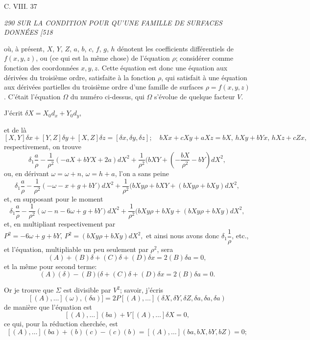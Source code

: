 \documentclass[11pt,a4paper]{book}
\begin{document}
\medskip
\hfill C. VIII. \hfill 37

\clearpage

\noindent\textit{290 \hfill SUR LA CONDITION POUR QU'UNE FAMILLE DE SURFACES DONN\'EES \hfill [518}

\medskip

o\`u, \`a pr\'esent, $X$, $Y$, $Z$, $a$, $b$, $c$, $f$, $g$, $h$ d\'enotent les coefficients diff\'erentiels de $f(x, y, z)$,
ou (ce qui est la m\^eme chose) de l'\'equation $\rho$; consid\'erer comme fonction des coordonn\'ees
$x, y, z$. Cette \'equation est donc une \'equation aux d\'eriv\'ees du troisi\`eme ordre,
satisfaite \`a la fonction $\rho$, qui satisfait \`a une \'equation aux d\'eriv\'ees partielles du troisi\`eme ordre
d'une famille de surfaces $\rho = f(x, y, z)$. C'\'etait l'\'equation $\Omega$ du num\'ero ci-dessus, qui
$\Omega$ s'\'evolue de quelque facteur $V$.

J'\'ecrit $\delta X = X_{0} d_{x} + Y_{0} d_{y}$,

\medskip

et de l\`a
\[
[X, Y]\delta x + [Y, Z]\delta y + [X, Z]\delta z = [\delta x, \delta y, \delta z]; \quad b X x + c X y + a X z = bX, \, h X y + b Y x, \, h X z + c Z x,
\]
respectivement, on trouve
\[
\delta_1\frac{a}{\rho} - \frac{1}{\rho^2}(- a X + b Y X + 2a)d X^2 + \frac{1}{\rho^2}(b X Y + (- \frac{b X}{\rho^2} - bY)d X^2,
\]
ou, en d\'erivant $\omega = \omega + n$, $\omega = h + a$, l'on a sans peine
\[
\delta_1\frac{a}{\rho} - \frac{1}{\rho^2}(- \omega - x + g + b Y)d X^2 + \frac{1}{\rho^2}(b X y \rho + b X Y + (b X y \rho + b X y)d X^2,
\]
et, en supposant pour le moment
\[
\delta_1\frac{a}{\rho} - \frac{1}{\rho^2}(\omega - n - 6\omega + g + b Y)d X^2 + \frac{1}{\rho^2}(b X y \rho + b X y + (b X y \rho + b X y)d X^2,
\]
et, en multipliant respectivement par $P^2 = - 6\omega + g + b Y, \, P^2 = (b X y \rho + b X y) d X^2,$ et ainsi
nous avons donc $\delta_1\dfrac{1}{\rho}$, etc., et l'\'equation, multipliable un peu seulement par $\rho^2$, sera
\[
(A) + (B)\delta + (C)\delta + (D)\delta x = 2(B)\delta a = 0,
\]
et la m\^eme pour second terme:
\[
(A)(\delta) - (B)(\delta + (C)\delta + (D)\delta x = 2(B)\delta a = 0.
\]

\medskip

\quad Or je trouve que $\Sigma$ est divisible par $V^2$; savoir, j'\'ecris
\[
[(A), \ldots]( \omega), (\delta a)] = 2P[(A), \ldots](\delta X, \delta Y, \delta Z, \delta a, \delta a, \delta a)
\]
de mani\`ere que l'\'equation est
\[
[(A), \ldots](b a) + V[(A), \ldots]\delta X = 0,
\]
ce qui, pour la r\'eduction cherch\'ee, est
\[
[(A), \ldots]( b a) + ( b)( c) - ( c)( b) = [(A), \ldots](b a, b X, b Y, b Z) = 0;
\]
\end{document}
